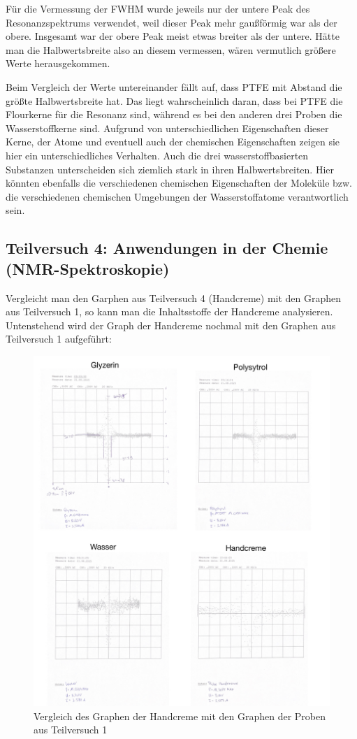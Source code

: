 \documentclass{article}
\begin{document}
Für die Vermessung der FWHM wurde jeweils nur der untere Peak des Resonanzspektrums
verwendet, weil dieser Peak mehr gaußförmig war als der obere.
Insgesamt war der obere Peak meist etwas breiter als der untere. Hätte man
die Halbwertsbreite also an diesem vermessen, wären vermutlich größere
Werte herausgekommen.

Beim Vergleich der Werte untereinander fällt auf, dass PTFE mit Abstand die größte
Halbwertsbreite hat. Das liegt wahrscheinlich daran, dass bei PTFE die Flourkerne
für die Resonanz sind, während es bei den anderen drei Proben die Wasserstoffkerne
sind. Aufgrund von unterschiedlichen Eigenschaften dieser Kerne, der Atome
und eventuell auch der chemischen Eigenschaften zeigen sie hier ein unterschiedliches
Verhalten. Auch die drei wasserstoffbasierten Substanzen unterscheiden sich
ziemlich stark in ihren Halbwertsbreiten. Hier könnten ebenfalls die verschiedenen
chemischen Eigenschaften der Moleküle bzw. die verschiedenen chemischen
Umgebungen der Wasserstoffatome verantwortlich sein.


\newpage

\subsection{Teilversuch 4: Anwendungen in der Chemie (NMR-Spektroskopie)}

Vergleicht man den Garphen aus Teilversuch 4 (Handcreme) mit den Graphen aus Teilversuch 1, so kann man die Inhaltsstoffe der Handcreme analysieren. Untenstehend wird der Graph der Handcreme nochmal mit den Graphen aus Teilversuch 1 aufgeführt:

    \begin{figure}[H]
        \centering
        \includegraphics[width=0.7\linewidth]{Abbildungen/VergleichGraphenTV4.jpeg}
        \caption{Vergleich des Graphen der Handcreme mit den Graphen der Proben aus Teilversuch 1}
    \end{figure}
\end{document}
